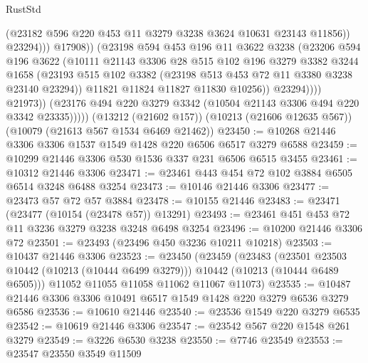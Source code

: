 \begin{lexlean}{RustStd}
\begin{coremodule}
                                (@23182 @596 @220 @453 @11 @3279 @3238 @3624 @10631 @23143 @11856))
                              @23294)))
                        @17908))
                    (@23198
                      @594
                      @453
                      @196
                      @11
                      @3622
                      @3238
                      (@23206
                        @594
                        @196
                        @3622
                        (@10111
                          @21143
                          @3306
                          @28
                          @515
                          @102
                          @196
                          @3279
                          @3382
                          @3244
                          @1658
                          (@23193
                            @515
                            @102
                            @3382
                            (@23198 @513 @453 @72 @11 @3380 @3238 @23140 @23294))
                          @11821
                          @11824
                          @11827
                          @11830
                          @10256))
                      @23294))))
              @21973))
          (@23176 @494 @220 @3279 @3342 (@10504 @21143 @3306 @494 @220 @3342 @23335)))))
    (@13212 (@21602 @157))
    (@10213 (@21606 @12635 @567))
    (@10079 (@21613 @567 @1534 @6469 @21462))
@23450 := @10268 @21446 @3306 @3306 @1537 @1549 @1428 @220 @6506 @6517 @3279 @6588
@23459 := @10299 @21446 @3306 @530 @1536 @337 @231 @6506 @6515 @3455
@23461 := @10312 @21446 @3306
@23471 := @23461 @443 @454 @72 @102 @3884 @6505 @6514 @3248 @6488 @3254
@23473 := @10146 @21446 @3306
@23477 := @23473 @57 @72 @57 @3884
@23478 := @10155 @21446
@23483 := @23471 (@23477 (@10154 (@23478 @57)) @13291)
@23493 := @23461 @451 @453 @72 @11 @3236 @3279 @3238 @3248 @6498 @3254
@23496 := @10200 @21446 @3306 @72
@23501 := @23493 (@23496 @450 @3236 @10211 @10218)
@23503 := @10437 @21446 @3306
@23523 := @23450
    (@23459
      (@23483
        (@23501 @23503 @10442 (@10213 (@10444 @6499 @3279)))
        @10442
        (@10213 (@10444 @6489 @6505)))
      @11052
      @11055
      @11058
      @11062
      @11067
      @11073)
@23535 := @10487 @21446 @3306 @3306 @10491 @6517 @1549 @1428 @220 @3279 @6536 @3279 @6586
@23536 := @10610 @21446
@23540 := @23536 @1549 @220 @3279 @6535
@23542 := @10619 @21446 @3306
@23547 := @23542 @567 @220 @1548 @261 @3279
@23549 := @3226 @6530 @3238
@23550 := @7746 @23549
@23553 := @23547 @23550 @3549 @11509

\end{coremodule}
\end{lexlean}
